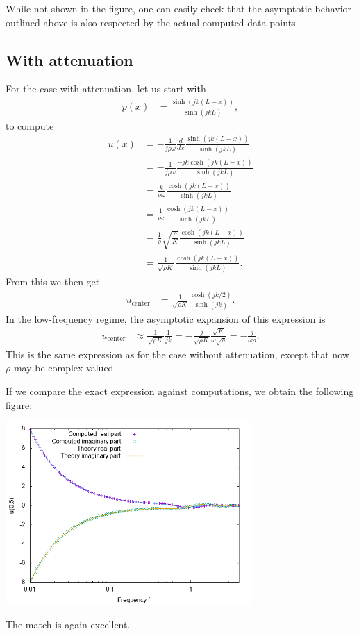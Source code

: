 \documentclass{article}
\begin{document}
While not shown
in the figure, one can easily check that the asymptotic behavior
outlined above is also respected by the actual computed data points.



\subsection{With attenuation}

For the case with attenuation, let us start with
\begin{align*}
  p(x)
  &=
  \frac{\sinh(jk(L-x))}{\sinh(jkL)},
\end{align*}
to compute
\begin{align*}
  u(x)
  &=
  -\frac{1}{j\rho\omega} \frac{d}{dx}
  \frac{\sinh(jk(L-x))}{\sinh(jkL)}
  \\
  &=
  -\frac{1}{j\rho\omega}
  \frac{-jk\cosh(jk(L-x))}{\sinh(jkL)}
  \\
  &=
  \frac{k}{\rho\omega}
  \frac{\cosh(jk(L-x))}{\sinh(jkL)}
  \\
  &=
  \frac{1}{\rho c}
  \frac{\cosh(jk(L-x))}{\sinh(jkL)}
  \\
  &=
  \frac{1}{\rho}\sqrt{\frac{\rho}{K}}
  \frac{\cosh(jk(L-x))}{\sinh(jkL)}
  \\
  &=
  \frac{1}{\sqrt{\rho K}}
  \frac{\cosh(jk(L-x))}{\sinh(jkL)}.
\end{align*}
From this we then get
\begin{align*}
  u_\text{center}
  &=
  \frac{1}{\sqrt{\rho K}}
  \frac{\cosh(jk/2)}{\sinh(jk)}.
\end{align*}
In the low-frequency regime, the asymptotic expansion of this
expression is
\begin{align*}
  u_\text{center}
  &\approx
  \frac{1}{\sqrt{\rho K}}
  \frac{1}{jk}
  =
  -\frac{j}{\sqrt{\rho K}}
  \frac{\sqrt{K}}{\omega\sqrt{\rho}}
  =
  -\frac{j}{\omega\rho}.
\end{align*}
This is the same expression as for the case without attenuation,
except that now $\rho$ may be complex-valued.

If we compare the exact expression against computations, we obtain the
following figure:
\begin{center}
\includegraphics[width=0.7\textwidth]{unit-cube/with-attenuation/velocity-at-center.png}
\end{center}
The match is again excellent.
\end{document}
